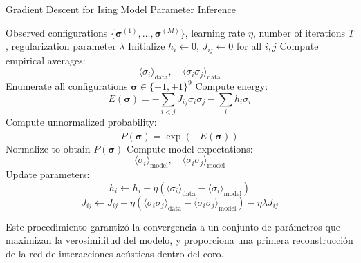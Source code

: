\begin{algorithm}[H]
    \caption{Gradient Descent for Ising Model Parameter Inference}
    \begin{algorithmic}[1]
    \Require Observed configurations \( \{\boldsymbol{\sigma}^{(1)}, \dots, \boldsymbol{\sigma}^{(M)}\} \), learning rate \( \eta \), number of iterations \( T \), regularization parameter \( \lambda \)
    \State Initialize \( h_i \gets 0 \), \( J_{ij} \gets 0 \) for all \( i, j \)
        \State Compute empirical averages:
            \[ \langle \sigma_i \rangle_{\text{data}}, \quad \langle \sigma_i \sigma_j \rangle_{\text{data}} \]
        \State Enumerate all configurations \( \boldsymbol{\sigma} \in \{-1, +1\}^9 \)
            \State Compute energy: 
                \[ E(\boldsymbol{\sigma}) = -\sum_{i<j} J_{ij} \sigma_i \sigma_j - \sum_i h_i \sigma_i \]
            \State Compute unnormalized probability: 
                \[ \tilde{P}(\boldsymbol{\sigma}) = \exp(-E(\boldsymbol{\sigma})) \]
        \EndFor
        \State Normalize to obtain \( P(\boldsymbol{\sigma}) \)
        \State Compute model expectations:
            \[ \langle \sigma_i \rangle_{\text{model}}, \quad \langle \sigma_i \sigma_j \rangle_{\text{model}} \]
        \State Update parameters:
            \[
            h_i \gets h_i + \eta \left( \langle \sigma_i \rangle_{\text{data}} - \langle \sigma_i \rangle_{\text{model}} \right)
            \]
            \[
            J_{ij} \gets J_{ij} + \eta \left( \langle \sigma_i \sigma_j \rangle_{\text{data}} - \langle \sigma_i \sigma_j \rangle_{\text{model}} \right) - \eta \lambda J_{ij}
            \]
    \EndFor
    \end{algorithmic}
\end{algorithm}

Este procedimiento garantizó la convergencia a un conjunto de 
parámetros que maximizan la verosimilitud del modelo, y 
proporciona una primera reconstrucción de la red de 
interacciones acústicas dentro del coro.
